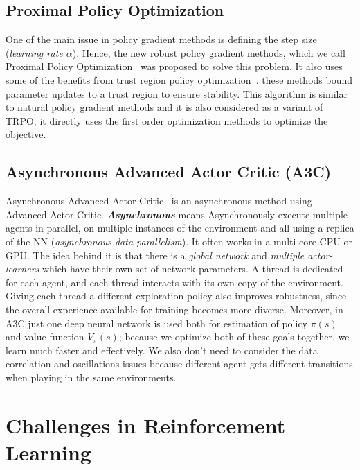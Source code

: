 \subsection{Proximal Policy Optimization}
One of the main issue in policy gradient methods is defining the step size (\textit{learning rate $\alpha$}). Hence, the new robust policy gradient methods, which we call Proximal Policy Optimization~\parencite{schulman2017proximal, heess2017emergence} was proposed to solve this problem. It also uses some of the benefits from trust region policy optimization~\parencite{schulman2015trust}. these methods bound parameter updates to a trust region to ensure stability.
This algorithm is similar to natural policy gradient methods and it is also considered as a variant of TRPO, it directly uses the first order optimization methods to optimize the objective.

\subsection{Asynchronous Advanced Actor Critic (\textbf{A3C})}
Asynchronous Advanced Actor Critic~\parencite{mnih2016asynchronous} is an asynchronous method using Advanced Actor-Critic. \textit{\textbf{Asynchronous}} means Asynchronously execute multiple agents in parallel, on multiple instances of the environment and all using a replica of the NN (\textit{asynchronous data parallelism}). It often works in a multi-core CPU or GPU. The idea behind it is that there is a \textit{global network} and \textit{multiple actor-learners} which have their own set of network parameters. A thread is dedicated for each agent, and each thread interacts with its own copy of the environment.\\
Giving each thread a different exploration policy also improves robustness, since the overall experience available for training becomes more diverse. Moreover, in A3C just one deep neural network is used both for estimation of policy $\pi(s)$ and value function $V_{\pi}(s)$; because we optimize both of these goals together, we learn much faster and effectively. We also don’t need to consider the data correlation and oscillations issues because different agent gets different transitions when playing in the same environments.

\clearpage

\section{Challenges in Reinforcement Learning} 